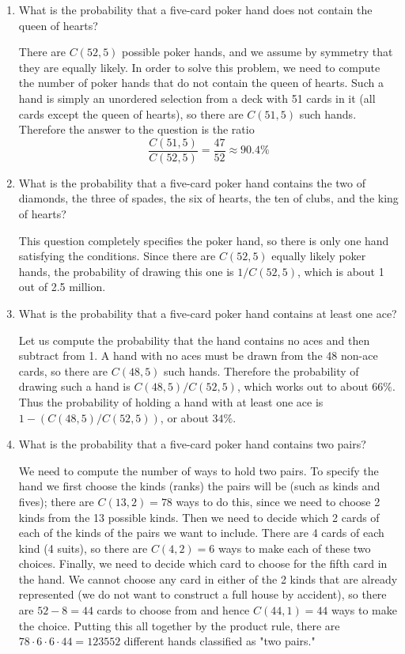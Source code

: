 \documentclass[11pt]{article}
\begin{document}
\begin{enumerate}[label=\textbf{\arabic*.}]
	\item What is the probability that a five-card poker hand does not contain the queen of hearts?
	
	There are $C(52, 5)$ possible poker hands, and we assume by symmetry that they are equally likely. In order to solve this problem, we need to compute the number of poker hands that do not contain the queen of hearts. Such a hand is simply an unordered selection from a deck with 51 cards in it (all cards except the queen of hearts), so there are $C(51, 5)$ such hands. Therefore the answer to the question is the ratio $$\frac{C(51, 5)}{C(52, 5)} = \frac{47}{52} \approx 90.4\%$$
	
	\item What is the probability that a five-card poker hand contains the two of diamonds, the three of spades, the six of hearts, the ten of clubs, and the king of hearts?
	
	This question completely specifies the poker hand, so there is only one hand satisfying the conditions. Since there are $C(52, 5)$ equally likely poker hands, the probability of drawing this one is $1 / C(52, 5)$, which is about 1 out of 2.5 million.
	
	\item What is the probability that a five-card poker hand contains at least one ace?
	
	Let us compute the probability that the hand contains no aces and then subtract from 1. A hand with no aces must be drawn from the 48 non-ace cards, so there are $C(48, 5)$ such hands. Therefore the probability of drawing such a hand is $C(48, 5) / C(52, 5)$, which works out to about $66\%$. Thus the probability of holding a hand with at least one ace is $1 - (C(48, 5) / C(52, 5))$, or about $34\%$.
	
	\item What is the probability that a five-card poker hand contains two pairs?
	
	We need to compute the number of ways to hold two pairs. To specify the hand we first choose the kinds (ranks) the pairs will be (such as kinds and fives); there are $C(13, 2) = 78$ ways to do this, since we need to choose 2 kinds from the 13 possible kinds. Then we need to decide which 2 cards of each of the kinds of the pairs we want to include. There are 4 cards of each kind (4 suits), so there are $C(4, 2) = 6$ ways to make each of these two choices. Finally, we need to decide which card to choose for the fifth card in the hand. We cannot choose any card in either of the 2 kinds that are already represented (we do not want to construct a full house by accident), so there are $52 - 8 = 44$ cards to choose from and hence $C(44, 1) = 44$ ways to make the choice. Putting this all together by the product rule, there are $78 \cdot 6 \cdot 6 \cdot 44 = 123552$ different hands classified as "two pairs."
	

\end{enumerate}
\end{document}
